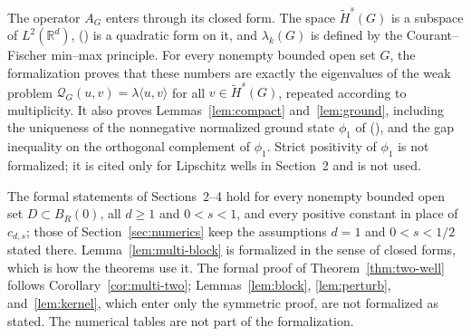 \documentclass[twoside,10pt]{article}
\numberwithin{equation}{section}
\theoremstyle{slbody}
\theoremstyle{definition}
\newcommand{\R}{\mathbb{R}}
\newcommand{\Hs}{\widetilde H^s}
\renewcommand{\eqref}[1]{%
  \textup{{\normalfont(\oldstylenums{\ref{#1}}}\normalfont)}}
\begin{document}
The operator $A_G$ enters through its closed form.  The space $\Hs(G)$ is a
subspace of $L^2(\R^d)$, \eqref{eq:form} is a quadratic form on it, and
$\lambda_k(G)$ is defined by the Courant--Fischer min--max principle.  For
every nonempty bounded open set $G$, the formalization proves that these numbers are
exactly the eigenvalues of the weak problem
$\mathcal{Q}_G(u,v)=\lambda\langle u,v\rangle$ for all $v\in\Hs(G)$, repeated
according to multiplicity.  It also proves Lemmas~\ref{lem:compact}
and~\ref{lem:ground}, including the uniqueness of the nonnegative normalized
ground state $\phi_1$ of \eqref{eq:mass}, and the gap inequality on the
orthogonal complement of $\phi_1$.  Strict positivity of $\phi_1$ is not
formalized; it is cited only for Lipschitz wells in Section~2 and is not used.

The formal statements of Sections~2--4 hold for every nonempty bounded open set
$D\subset B_R(0)$, all $d\geq1$ and $0<s<1$, and every positive constant in
place of $c_{d,s}$; those of Section~\ref{sec:numerics} keep the assumptions
$d=1$ and $0<s<1/2$ stated there.  Lemma~\ref{lem:multi-block} is formalized
in the sense of closed forms, which is how the theorems use it.
The formal proof of Theorem~\ref{thm:two-well} follows
Corollary~\ref{cor:multi-two}; Lemmas~\ref{lem:block}, \ref{lem:perturb},
and~\ref{lem:kernel}, which enter only the symmetric proof, are not
formalized as stated.  The numerical tables are not part of the
formalization.
\end{document}
